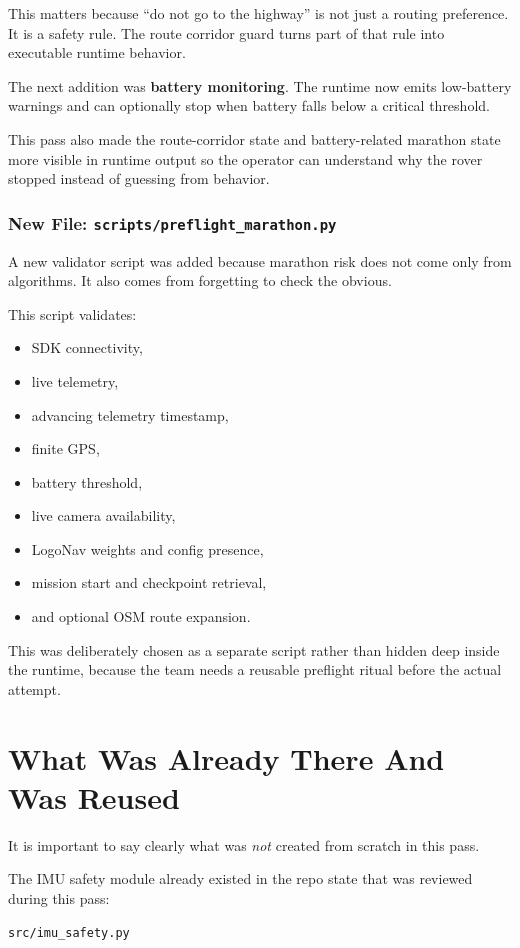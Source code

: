 \documentclass[11pt]{article}
\begin{document}
This matters because ``do not go to the highway'' is not just a routing preference. It is a safety rule. The route corridor guard turns part of that rule into executable runtime behavior.

The next addition was \textbf{battery monitoring}. The runtime now emits low-battery warnings and can optionally stop when battery falls below a critical threshold.

This pass also made the route-corridor state and battery-related marathon state more visible in runtime output so the operator can understand why the rover stopped instead of guessing from behavior.

\subsubsection{New File: \texttt{scripts/preflight\_marathon.py}}
A new validator script was added because marathon risk does not come only from algorithms. It also comes from forgetting to check the obvious.

This script validates:
\begin{itemize}[leftmargin=*]
\item SDK connectivity,
\item live telemetry,
\item advancing telemetry timestamp,
\item finite GPS,
\item battery threshold,
\item live camera availability,
\item LogoNav weights and config presence,
\item mission start and checkpoint retrieval,
\item and optional OSM route expansion.
\end{itemize}

This was deliberately chosen as a separate script rather than hidden deep inside the runtime, because the team needs a reusable preflight ritual before the actual attempt.

\section{What Was Already There And Was Reused}
It is important to say clearly what was \emph{not} created from scratch in this pass.

The IMU safety module already existed in the repo state that was reviewed during this pass:
\begin{verbatim}
src/imu_safety.py
\end{verbatim}
\end{document}
